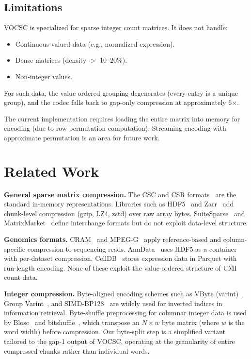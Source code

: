 \documentclass[10pt,twocolumn,letterpaper]{article}
\begin{document}
\subsection{Limitations}

VOCSC is specialized for sparse integer count matrices.
It does not handle:
\begin{itemize}
\item Continuous-valued data (e.g., normalized expression).
\item Dense matrices (density $>$ 10--20\%).
\item Non-integer values.
\end{itemize}
For such data, the value-ordered grouping degenerates (every entry is a unique group), and the codec falls back to gap-only compression at approximately 6$\times$.

The current implementation requires loading the entire matrix into memory for encoding (due to row permutation computation).
Streaming encoding with approximate permutation is an area for future work.

\section{Related Work}

\textbf{General sparse matrix compression.}
The CSC and CSR formats~\cite{barrett1994templates} are the standard in-memory representations.
Libraries such as HDF5~\cite{folk2011overview} and Zarr~\cite{miles2024zarr} add chunk-level compression (gzip, LZ4, zstd) over raw array bytes.
SuiteSparse~\cite{davis2019algorithm} and MatrixMarket~\cite{boisvert1997matrix} define interchange formats but do not exploit data-level structure.

\textbf{Genomics formats.}
CRAM~\cite{hsi2011cram} and MPEG-G~\cite{voges2021mpeg} apply reference-based and column-specific compression to sequencing reads.
AnnData~\cite{anndata} uses HDF5 as a container with per-dataset compression.
CellDB~\cite{sikkema2023integrated} stores expression data in Parquet with run-length encoding.
None of these exploit the value-ordered structure of UMI count data.

\textbf{Integer compression.}
Byte-aligned encoding schemes such as VByte (varint)~\cite{williams1999compressing}, Group Varint~\cite{dean2009challenges}, and SIMD-BP128~\cite{lemire2015decoding} are widely used for inverted indices in information retrieval.
Byte-shuffle preprocessing for columnar integer data is used by Blosc~\cite{alted2010blosc} and bitshuffle~\cite{masui2015bitshuffle}, which transpose an $N \times w$ byte matrix (where $w$ is the word width) before compression.
Our byte-split step is a simplified variant tailored to the gap-1 output of VOCSC, operating at the granularity of entire compressed chunks rather than individual words.
\end{document}
